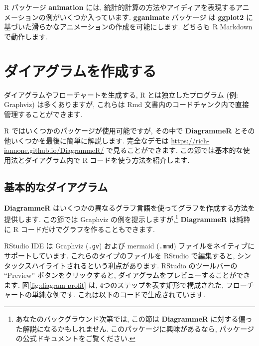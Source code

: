 \documentclass[
  11pt,
]{bxjsreport}
\begin{document}
R パッケージ \textbf{animation} \autocite{R-animation} には, 統計的計算の方法やアイディアを表現するアニメーションの例がいくつか入っています. \textbf{gganimate} パッケージ \autocite{R-gganimate} は \textbf{ggplot2} \autocite{R-ggplot2} に基づいた滑らかなアニメーションの作成を可能にします. どちらも R Markdown で動作します.

\hypertarget{diagrams}{%
\section{ダイアグラムを作成する}\label{diagrams}}

ダイアグラムやフローチャートを生成する, R とは独立したプログラム (例: Graphviz) は多くありますが, これらは Rmd 文書内のコードチャンク内で直接管理することができます.

R ではいくつかのパッケージが使用可能ですが, その中で \textbf{DiagrammeR} \autocite{R-DiagrammeR} とその他いくつかを最後に簡単に解説します. 完全なデモは \url{https://rich-iannone.github.io/DiagrammeR/} で見ることができます. この節では基本的な使用法とダイアグラム内で R コードを使う方法を紹介します.

\hypertarget{basic-diagrams}{%
\subsection{基本的なダイアグラム}\label{basic-diagrams}}

\textbf{DiagrammeR} はいくつかの異なるグラフ言語を使ってグラフを作成する方法を提供します. この節では Graphviz の例を提示しますが,\footnote{あなたのバックグラウンド次第では, この節は \textbf{DiagrammeR} に対する偏った解説になるかもしれません. このパッケージに興味があるなら, パッケージの公式ドキュメントをご覧ください.} \textbf{DiagrammeR} は純粋に R コードだけでグラフを作ることもできます.

RStudio IDE は Graphviz (\texttt{.gv}) および mermaid (\texttt{.mmd}) ファイルをネイティブにサポートしています. これらのタイプのファイルを RStudio で編集すると, シンタックスハイライトされるという利点があります. RStudio のツールバーの ``Preview'' ボタンをクリックすると, ダイアグラムをプレビューすることができます. 図\ref{fig:diagram-profit} は, 4つのステップを表す矩形で構成された, フローチャートの単純な例です. これは以下のコードで生成されています.
\end{document}
